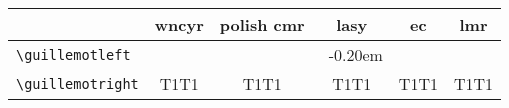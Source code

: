 \documentclass[a4paper,11pt]{article}
\newcommand\CyrGuillemot{%
  \def\selectguillfont{\fontencoding{OT2}\fontfamily{wncyr}\selectfont}
  \def\guillemotleft{\selectguillfont\symbol{60}}
  \def\guillemotright{\selectguillfont\symbol{62}}
}
\newcommand\PlGuillemot{%
  \def\selectguillfont{\fontencoding{OT4}\fontfamily{cmr}\selectfont}
  \def\guillemotleft{\selectguillfont\symbol{174}}
  \def\guillemotright{\selectguillfont\symbol{175}}
}
\newcommand\LaGuillemot{%
  \def\selectguillfont{\fontencoding{U}\fontfamily{lasy}%
    \fontseries{m}\fontshape{n}\selectfont}
  \def\guillemotleft{\selectguillfont\hbox{\symbol{40}%
    \kern-0.20em\symbol{40}}}
  \def\guillemotright{\selectguillfont\hbox{\symbol{41}%
    \kern-0.20em\symbol{41}}}
}
\newcommand\ECGuillemot{%
  \def\selectguillfont{\fontencoding{T1}\fontfamily{cmr}\selectfont}
  \def\guillemotleft{\selectguillfont\symbol{19}}
  \def\guillemotright{\selectguillfont\symbol{20}}
}
\newcommand\LMGuillemot{%
  \def\selectguillfont{\fontencoding{T1}\fontfamily{lmr}\selectfont}
  \def\guillemotleft{\selectguillfont\symbol{19}}
  \def\guillemotright{\selectguillfont\symbol{20}}
}
\newcommand\CyrGLeft{\CyrGuillemot\guillemotleft}
\newcommand\CyrGRight{\CyrGuillemot\guillemotright}
\newcommand\PlGLeft{\PlGuillemot\guillemotleft}
\newcommand\PlGRight{\PlGuillemot\guillemotright}
\newcommand\LaGLeft{\LaGuillemot\guillemotleft}
\newcommand\LaGRight{\LaGuillemot\guillemotright}
\newcommand\ECGLeft{\ECGuillemot\guillemotleft}
\newcommand\ECGRight{\ECGuillemot\guillemotright}
\newcommand\LMGLeft{\LMGuillemot\guillemotleft}
\newcommand\LMGRight{\LMGuillemot\guillemotright}
\begin{document}
\begin{tabular}{l|ccccc}
                            & \textbf{wncyr}  & \textbf{polish cmr} 
                            & \textbf{lasy}   & \textbf{ec} & \textbf{lmr} \\ \hline
    \verb|\guillemotleft|   & \CyrGLeft       & \PlGLeft 
                            & \LaGLeft        & \ECGLeft  & \LMGLeft  \\
    \verb|\guillemotright|  & \CyrGRight      & \PlGRight
                            & \LaGRight       & \ECGRight & \LMGRight
\end{tabular}
  
\end{document}
